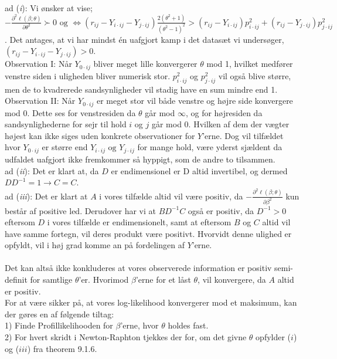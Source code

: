 \documentclass[11pt,a4paper]{article}
\begin{document}
ad (\textit{i}): 
Vi ønsker at vise; $-\frac{\partial^2 \ell(\beta;\theta)}{\partial \theta^2} \succ 0 \text{ og } \iff (r_{ij}- Y_{i\cdot ij}-Y_{j\cdot ij}) \frac{2(\theta^2+1)}{(\theta^2-1)^2}>(r_{ij}-Y_{i\cdot ij})p_{i\cdot ij}^2 + (r_{ij}-Y_{j\cdot ij})p_{j\cdot ij}^2$. Det antages, at vi har mindst én uafgjort kamp i det datasæt vi undersøger, $(r_{ij}- Y_{i\cdot ij}-Y_{j\cdot ij}) > 0$.
\\Observation I: Når $Y_{0\cdot ij}$ bliver meget lille konvergerer $\theta$ mod 1, hvilket medfører venstre siden i uligheden bliver numerisk stor. $p_{i\cdot ij}^2$ og $p_{j\cdot ij}^2$ vil også blive større, men de to kvadrerede sandsynligheder vil stadig have en sum mindre end 1.\\
Observation II: Når $Y_{0\cdot ij}$ er meget stor vil både venstre og højre side konvergere mod 0. Dette ses for venstresiden da $\theta$ går mod  $\infty$, og for højresiden da sandsynlighederne for sejr til hold $i$ og $j$ går mod 0. Hvilken af dem der vægter højest kan ikke siges uden konkrete observationer for $Y$'erne. Dog vil tilfældet hvor $Y_{0 \cdot ij}$ er større end $Y_{i \cdot ij} \text{ og } Y_{j \cdot ij}$ for mange hold, være yderst sjældent da udfaldet uafgjort ikke fremkommer så hyppigt, som de andre to tilsammen.\\
ad (\textit{ii}): Det er klart at, da $D$ er endimensionel er D altid invertibel, og dermed $D D^{-1}=1 \rightarrow C=C$.\\
ad (\textit{iii}):
Det er klart at $A$ i vores tilfælde altid vil være positiv, da $-\frac{\partial^2 \ell(\beta;\theta)}{\partial \beta^2}$ kun består af positive led.
Derudover har vi at $BD^{-1}C$ også er positiv, da $D^{-1}>0$ eftersom $D$ i vores tilfælde er endimensionelt, samt at eftersom $B$ og $C$ altid vil have samme fortegn, vil deres produkt være positivt. Hvorvidt denne ulighed er opfyldt, vil 
i høj grad komme an på fordelingen af $Y$'erne. \\\\
Det kan altså ikke konkluderes at vores observerede information er positiv semi-definit for samtlige $\theta$'er. Hvorimod $\beta$'erne for et låst $\theta$, vil konvergere, da $A$ altid er positiv. \\
For at være sikker på, at vores log-likelihood konvergerer mod et maksimum, kan der gøres en af følgende tiltag:\\
1) Finde Profillikelihooden for $\beta$'erne, hvor $\theta$ holdes fast.\\
2) For hvert skridt i Newton-Raphton tjekkes der for, om det givne $\theta$ opfylder ($i$) og ($iii$) fra theorem 9.1.6.\\
\end{document}
